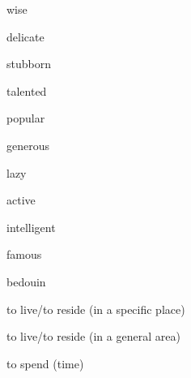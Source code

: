 \documentclass[avery5371,grid,frame]{flashcards}
\begin{document}
\begin{flashcard}{\LARGE wise}
\LARGE {}
\end{flashcard}
\begin{flashcard}{\LARGE delicate}
\LARGE {}
\end{flashcard}
\begin{flashcard}{\LARGE stubborn}
\LARGE {}
\end{flashcard}
\begin{flashcard}{\LARGE talented}
\LARGE {}
\end{flashcard}
\begin{flashcard}{\LARGE popular}
\LARGE {}
\end{flashcard}
\begin{flashcard}{\LARGE generous}
\LARGE {}
\end{flashcard}
\begin{flashcard}{\LARGE lazy}
\LARGE {}
\end{flashcard}
\begin{flashcard}{\LARGE active}
\LARGE {}
\end{flashcard}
\begin{flashcard}{\LARGE intelligent}
\LARGE {}
\end{flashcard}
\begin{flashcard}{\LARGE famous}
\LARGE {}
\end{flashcard}
\begin{flashcard}{\LARGE bedouin}
\LARGE {}
\end{flashcard}
\begin{flashcard}{\LARGE to live/to reside (in a specific place)}
\LARGE {}
\end{flashcard}
\begin{flashcard}{\LARGE to live/to reside (in a general area)}
\LARGE {}
\end{flashcard}
\begin{flashcard}{\LARGE to spend (time)}
\LARGE {}
\end{flashcard}
\end{document}
